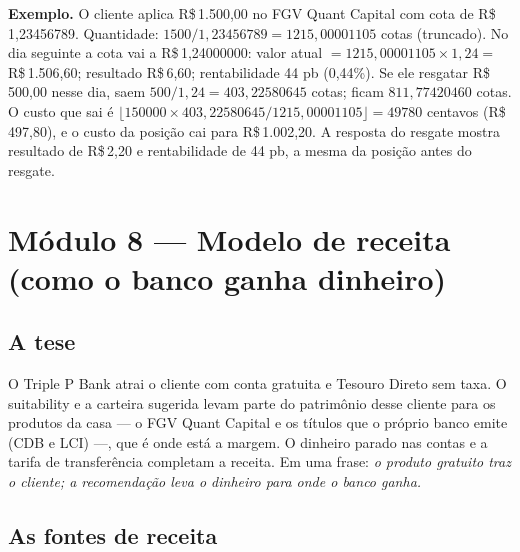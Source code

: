 \documentclass[11pt,a4paper]{article}
\newcommand{\banco}{Triple P Bank}            %
\newcommand{\fundo}{FGV Quant Capital}     %
\newcommand{\rs}{R\$\,}
\begin{document}
\textbf{Exemplo.} O cliente aplica \rs 1.500,00 no \fundo{} com cota de \rs 1,23456789.
Quantidade: $1500 / 1{,}23456789 = 1215{,}00001105$ cotas (truncado). No dia seguinte a cota vai
a \rs 1,24000000: valor atual $= 1215{,}00001105 \times 1{,}24 = $ \rs 1.506,60; resultado
\rs 6,60; rentabilidade 44 pb (0,44\%). Se ele resgatar \rs 500,00 nesse dia, saem
$500 / 1{,}24 = 403{,}22580645$ cotas; ficam $811{,}77420460$ cotas. O custo que sai é
$\lfloor 150000 \times 403{,}22580645 / 1215{,}00001105 \rfloor = 49780$ centavos (\rs 497,80), e o
custo da posição cai para \rs 1.002,20. A resposta do resgate mostra resultado de \rs 2,20 e
rentabilidade de 44 pb, a mesma da posição antes do resgate.

\section{Módulo 8 --- Modelo de receita (como o banco ganha dinheiro)}\label{sec:receita}

\subsection{A tese}

O \banco{} atrai o cliente com conta gratuita e Tesouro Direto sem taxa. O suitability e a carteira
sugerida levam parte do patrimônio desse cliente para os produtos da casa --- o \fundo{} e os
títulos que o próprio banco emite (CDB e LCI) ---, que é onde está a margem. O dinheiro parado nas
contas e a tarifa de transferência completam a receita. Em uma frase: \emph{o produto gratuito traz
o cliente; a recomendação leva o dinheiro para onde o banco ganha.}

\subsection{As fontes de receita}
\end{document}
